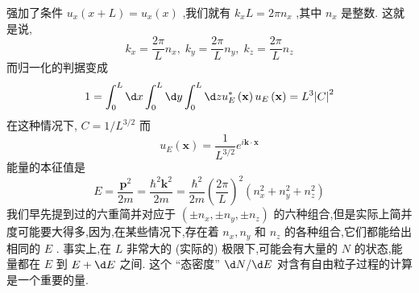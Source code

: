 强加了条件 ${u}_{x}\left( {x + L}\right) = {u}_{x}\left( x\right)$ ,我们就有 ${k}_{x}L = {2\pi }{n}_{x}$ ,其中 ${n}_{x}$ 是整数. 这就是说,
\begin{equation}
{k}_{x} = \frac{2\pi }{L}{n}_{x},\;{k}_{y} = \frac{2\pi }{L}{n}_{y},\;{k}_{z} = \frac{2\pi }{L}{n}_{z}
\end{equation}
而归一化的判据变成
\begin{equation}
1 = \int_{0}^{L}{\d x}\int_{0}^{L}{\d y}\int_{0}^{L}{\d z}{u}_{E}^{ * }\left( \mathbf{x}\right) {u}_{E}\left( \mathbf{x}\right) = {L}^{3}{\left| C\right| }^{2}
\end{equation}
在这种情况下, $C = 1/{L}^{3/2}$ 而
\begin{equation}
{u}_{E}\left( \mathbf{x}\right) = \frac{1}{{L}^{3/2}}{e}^{i\mathbf{k} \cdot \mathbf{x}}
\end{equation}
能量的本征值是
\begin{equation}
E = \frac{{\mathbf{p}}^{2}}{2m} = \frac{{\hbar }^{2}{\mathbf{k}}^{2}}{2m} = \frac{{\hbar }^{2}}{2m}{\left( \frac{2\pi }{L}\right) }^{2}\left( {{n}_{x}^{2} + {n}_{y}^{2} + {n}_{z}^{2}}\right)
\end{equation}
我们早先提到过的六重简并对应于 $\left( {\pm {n}_{x}, \pm {n}_{y}, \pm {n}_{z}}\right)$ 的六种组合,但是实际上简并度可能要大得多,因为,在某些情况下,存在着 ${n}_{x},{n}_{y}$ 和 ${n}_{z}$ 的各种组合,它们都能给出相同的 $E$ . 事实上,在 $L$ 非常大的 (实际的) 极限下,可能会有大量的 $N$ 的状态,能量都在 $E$ 到 $E + {\d E}$ 之间. 这个 “态密度” ${\d N}/{\d E}$ 对含有自由粒子过程的计算是一个重要的量.

